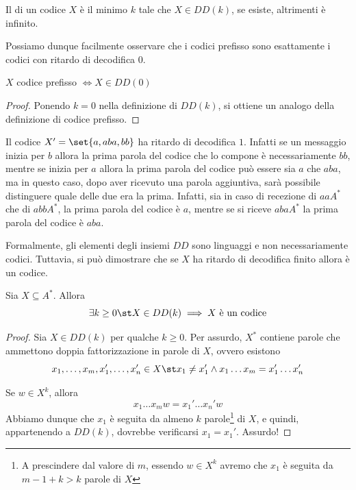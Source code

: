 \begin{definition}{}
  Il  di un codice \(X\) è il minimo \(k\) tale che \(X \in DD(k)\), se esiste, altrimenti è infinito.
\end{definition}

Possiamo dunque facilmente osservare che i codici prefisso sono esattamente i codici con ritardo di decodifica \(0\).
\begin{proposition}{}
  \(X\) codice prefisso \(\iff X \in DD(0)\)
\end{proposition}

\begin{proof}
  Ponendo \(k=0\) nella definizione di \(DD(k)\), si ottiene un analogo della definizione di codice prefisso.
\end{proof}

\begin{example}[label=ex:code-with-decoding-delay-one]{}
  Il codice \(X' = \set{a,aba,bb}\) ha ritardo di decodifica \(1\).
  Infatti se un messaggio inizia per \(b\) allora la prima parola del codice che lo compone
  è necessariamente \(bb\), mentre se inizia per \(a\) allora la prima parola del codice può essere sia 
  \(a\) che \(aba\), ma in questo caso, dopo aver ricevuto una parola aggiuntiva, sarà possibile distinguere
  quale delle due era la prima.
  Infatti, sia in caso di recezione di \(aaA^*\) che di \(abbA^*\), la prima parola del codice è \(a\), mentre se si riceve \(abaA^*\) la prima parola del codice è \(aba\).
\end{example}

Formalmente, gli elementi degli insiemi $DD$ sono linguaggi e non necessariamente codici. Tuttavia, si può dimostrare che se \(X\) ha ritardo di decodifica finito allora è un codice.

\begin{proposition}{}
  Sia \(X \subseteq A^*\). Allora
  \[\exists k \geq 0 \st X \in DD(k) \implies X \text{ è un codice}\]
\end{proposition}

\begin{proof}
  Sia \(X \in DD(k)\) per qualche \(k \geq 0\). Per assurdo, \(X^*\) contiene parole che ammettono doppia fattorizzazione in parole di \(X\), ovvero esistono
  \[x_1,\ldots,x_m,x_1',\ldots,x_n' \in X \st x_1\neq x_1' \land x_1\ldots x_m = x_1'\ldots x_n'\]

  Se \(w \in X^k\), allora
  \[x_1\ldots x_m w = x_1'\ldots x_n' w\]
  Abbiamo dunque che \(x_1\) è seguita da almeno \(k\) parole\footnote{A prescindere dal valore di \(m\), essendo \(w \in X^k\) avremo che \(x_1\) è seguita da \(m-1+k>k\) parole di \(X\)} di \(X\), e quindi, appartenendo a \(DD(k)\), dovrebbe verificarsi \(x_1 = x_1'\). Assurdo!
\end{proof}

